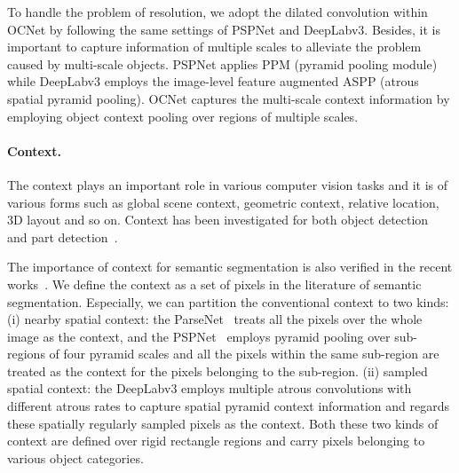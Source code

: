 \documentclass[10pt,twocolumn,letterpaper]{article}
\begin{document}
To handle the problem of resolution, we adopt the dilated convolution within OCNet by following the same settings of PSPNet and DeepLabv3.
Besides, it is important to capture information of multiple scales to alleviate the problem caused by multi-scale objects. PSPNet applies PPM (pyramid pooling module) while DeepLabv3 employs the image-level feature augmented ASPP (atrous spatial pyramid pooling).
OCNet captures the multi-scale context information by employing object context pooling over regions of multiple scales.

\paragraph{Context.}
The context plays an important role in various computer vision tasks and it is of various forms such as global scene context, geometric context, relative location, 3D layout and so on.
Context has been investigated for both object detection~\cite{divvala2009empirical,Liu_2018_CVPR} and part detection~\cite{Gonzalez-Garcia_2018_CVPR}.

The importance of context for semantic segmentation is also verified in the recent works~\cite{liu2015parsenet,zhao2017pyramid,chen2017rethinking}.
We define the context as a set of pixels in the literature of semantic segmentation.
Especially, we can partition the conventional context to two kinds:
(i) nearby spatial context: the ParseNet~\cite{liu2015parsenet} treats all the pixels over the whole image as the context, and the PSPNet~\cite{zhao2017pyramid} employs pyramid pooling over sub-regions of four pyramid scales and all the pixels within the same sub-region are treated as
the context for the pixels belonging to the sub-region.
(ii) sampled spatial context:  the DeepLabv3 employs multiple atrous convolutions with different atrous rates to capture spatial pyramid context information and regards these spatially regularly sampled pixels as the context.
Both these two kinds of context are defined over rigid rectangle regions and carry pixels belonging to various object categories.
\end{document}
